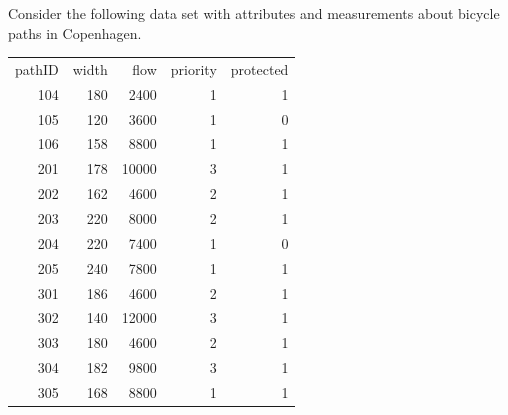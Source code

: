 \documentclass[addpoints,a4]{exam} %
\begin{document}
\begin{questions}
\clearpage
{} Consider the following data set with attributes and measurements about bicycle paths in Copenhagen.\\

\begin{tabular}{rrrrr}
pathID & width & flow  & priority & protected \\
104    & 180        & 2400  & 1        & 1         \\
105    & 120        & 3600  & 1        & 0         \\
106    & 158        & 8800  & 1        & 1         \\
201    & 178        & 10000 & 3        & 1         \\
202    & 162        & 4600  & 2        & 1         \\
203    & 220        & 8000  & 2        & 1         \\
204    & 220        & 7400  & 1        & 0         \\
205    & 240        & 7800  & 1        & 1         \\
301    & 186        & 4600  & 2        & 1         \\
302    & 140        & 12000 & 3        & 1         \\
303    & 180        & 4600  & 2        & 1         \\
304    & 182        & 9800  & 3        & 1         \\
305    & 168        & 8800  & 1        & 1      
\end{tabular}


\end{questions}
\end{document}

